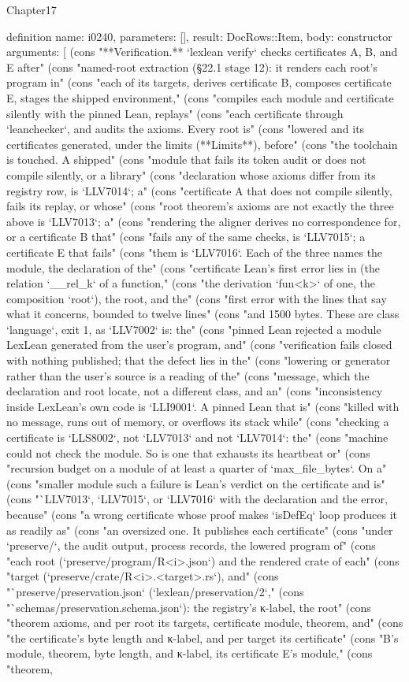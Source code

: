 \begin{lexlean}{Chapter17}
\begin{semanticmodule}
definition{
  name: i0240,
  parameters: [],
  result: DocRows::Item,
  body: constructor{
    arguments: [
      (cons "**Verification.** `lexlean verify` checks certificates A, B, and E after" (cons "named-root extraction (§22.1 stage 12): it renders each root's program in" (cons "each of its targets, derives certificate B, composes certificate E, stages the shipped environment," (cons "compiles each module and certificate silently with the pinned Lean, replays" (cons "each certificate through `leanchecker`, and audits the axioms. Every root is" (cons "lowered and its certificates generated, under the limits (**Limits**), before" (cons "the toolchain is touched. A shipped" (cons "module that fails its token audit or does not compile silently, or a library" (cons "declaration whose axioms differ from its registry row, is `LLV7014`; a" (cons "certificate A that does not compile silently, fails its replay, or whose" (cons "root theorem's axioms are not exactly the three above is `LLV7013`; a" (cons "rendering the aligner derives no correspondence for, or a certificate B that" (cons "fails any of the same checks, is `LLV7015`; a certificate E that fails" (cons "them is `LLV7016`. Each of the three names the module, the declaration of the" (cons "certificate Lean's first error lies in (the relation `__rel_k` of a function," (cons "the derivation `fun<k>` of one, the composition `root`), the root, and the" (cons "first error with the lines that say what it concerns, bounded to twelve lines" (cons "and 1500 bytes. These are class `language`, exit 1, as `LLV7002` is: the" (cons "pinned Lean rejected a module LexLean generated from the user's program, and" (cons "verification fails closed with nothing published; that the defect lies in the" (cons "lowering or generator rather than the user's source is a reading of the" (cons "message, which the declaration and root locate, not a different class, and an" (cons "inconsistency inside LexLean's own code is `LLI9001`. A pinned Lean that is" (cons "killed with no message, runs out of memory, or overflows its stack while" (cons "checking a certificate is `LLS8002`, not `LLV7013` and not `LLV7014`: the" (cons "machine could not check the module. So is one that exhausts its heartbeat or" (cons "recursion budget on a module of at least a quarter of `max_file_bytes`. On a" (cons "smaller module such a failure is Lean's verdict on the certificate and is" (cons "`LLV7013`, `LLV7015`, or `LLV7016` with the declaration and the error, because" (cons "a wrong certificate whose proof makes `isDefEq` loop produces it as readily as" (cons "an oversized one. It publishes each certificate" (cons "under `preserve/`, the audit output, process records, the lowered program of" (cons "each root (`preserve/program/R<i>.json`) and the rendered crate of each" (cons "target (`preserve/crate/R<i>.<target>.rs`), and" (cons "`preserve/preservation.json` (`lexlean/preservation/2`," (cons "`schemas/preservation.schema.json`): the registry's κ-label, the root" (cons "theorem axioms, and per root its targets, certificate module, theorem, and" (cons "the certificate's byte length and κ-label, and per target its certificate" (cons "B's module, theorem, byte length, and κ-label, its certificate E's module," (cons "theorem, }}
\end{semanticmodule}
\end{lexlean}
